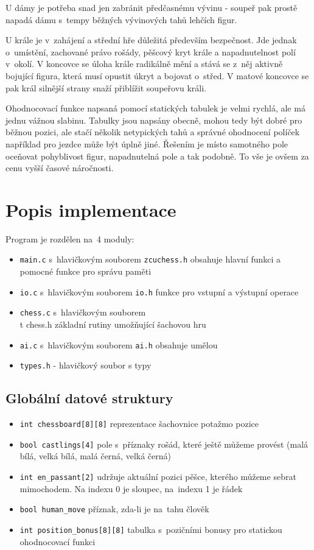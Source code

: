 \documentclass[11pt, titlepage]{article}
\begin{document}
U dámy je potřeba snad jen zabránit předčasnému vývinu - soupeř pak prostě napadá dámu s~tempy běžných vývinových tahů lehčích figur.

U krále je v~zahájení a střední hře důležitá především bezpečnost. Jde jednak o~umístění, zachované právo rošády, pěšcový kryt krále a napadnutelnost polí v~okolí. V koncovce se úloha krále radikálně mění a stává se z~něj aktivně bojující figura, která musí opustit úkryt a bojovat o~střed. V matové koncovce se pak král silnější strany snaží přiblížit soupeřovu  králi.

Ohodnocovací funkce napsaná pomocí statických tabulek je velmi rychlá, ale má jednu vážnou slabinu. Tabulky jsou napsány obecně, mohou tedy být dobré pro běžnou pozici, ale stačí několik netypických tahů a správné ohodnocení políček například pro jezdce může být úplně jiné. Řešením je místo samotného pole oceňovat pohyblivost figur, napadnutelná pole a tak podobně. To vše je ovšem za cenu vyšší časové náročnosti.

\section{Popis implementace}

Program je rozdělen na~4 moduly:
\begin{itemize}
	\item {\tt main.c} s~hlavičkovým souborem {\tt zcuchess.h} obsahuje hlavní funkci a pomocné funkce pro správu paměti
	\item {\tt io.c} s~hlavičkovým souborem {\tt io.h} funkce pro vstupní a výstupní operace
	\item {\tt chess.c} s~hlavičkovým souborem { \\t chess.h} základní rutiny umožňující šachovou hru
	\item {\tt ai.c} s~hlavičkovým souborem {\tt ai.h} obsahuje umělou 
	\item {\tt types.h} - hlavičkový soubor s typy
\end{itemize}

\subsection{Globální datové struktury}
\begin{itemize}
	\item {\tt int chessboard[8][8]} reprezentace šachovnice potažmo pozice
	\item {\tt bool castlings[4]} pole s~příznaky rošád, které ještě můžeme provést (malá bílá, velká bílá, malá černá, velká černá)
	\item {\tt int en\_passant[2]} udržuje aktuální pozici pěšce, kterého můžeme sebrat mimochodem. Na indexu 0 je sloupec, na~indexu 1 je řádek
	\item {\tt bool human\_move} příznak, zda-li je na~tahu člověk
	\item {\tt int position\_bonus[8][8]} tabulka s~pozičními bonusy pro statickou ohodnocovací funkci
\end{itemize}
\end{document}
